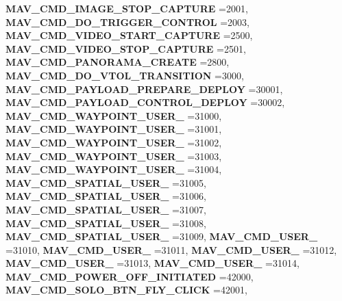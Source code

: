 \begin{DoxyCompactItemize}
\textbf{ M\+A\+V\+\_\+\+C\+M\+D\+\_\+\+I\+M\+A\+G\+E\+\_\+\+S\+T\+O\+P\+\_\+\+C\+A\+P\+T\+U\+RE} =2001, 
\textbf{ M\+A\+V\+\_\+\+C\+M\+D\+\_\+\+D\+O\+\_\+\+T\+R\+I\+G\+G\+E\+R\+\_\+\+C\+O\+N\+T\+R\+OL} =2003, 
\textbf{ M\+A\+V\+\_\+\+C\+M\+D\+\_\+\+V\+I\+D\+E\+O\+\_\+\+S\+T\+A\+R\+T\+\_\+\+C\+A\+P\+T\+U\+RE} =2500, 
\newline
\textbf{ M\+A\+V\+\_\+\+C\+M\+D\+\_\+\+V\+I\+D\+E\+O\+\_\+\+S\+T\+O\+P\+\_\+\+C\+A\+P\+T\+U\+RE} =2501, 
\textbf{ M\+A\+V\+\_\+\+C\+M\+D\+\_\+\+P\+A\+N\+O\+R\+A\+M\+A\+\_\+\+C\+R\+E\+A\+TE} =2800, 
\textbf{ M\+A\+V\+\_\+\+C\+M\+D\+\_\+\+D\+O\+\_\+\+V\+T\+O\+L\+\_\+\+T\+R\+A\+N\+S\+I\+T\+I\+ON} =3000, 
\textbf{ M\+A\+V\+\_\+\+C\+M\+D\+\_\+\+P\+A\+Y\+L\+O\+A\+D\+\_\+\+P\+R\+E\+P\+A\+R\+E\+\_\+\+D\+E\+P\+L\+OY} =30001, 
\newline
\textbf{ M\+A\+V\+\_\+\+C\+M\+D\+\_\+\+P\+A\+Y\+L\+O\+A\+D\+\_\+\+C\+O\+N\+T\+R\+O\+L\+\_\+\+D\+E\+P\+L\+OY} =30002, 
\textbf{ M\+A\+V\+\_\+\+C\+M\+D\+\_\+\+W\+A\+Y\+P\+O\+I\+N\+T\+\_\+\+U\+S\+E\+R\+\_} =31000, 
\textbf{ M\+A\+V\+\_\+\+C\+M\+D\+\_\+\+W\+A\+Y\+P\+O\+I\+N\+T\+\_\+\+U\+S\+E\+R\+\_} =31001, 
\textbf{ M\+A\+V\+\_\+\+C\+M\+D\+\_\+\+W\+A\+Y\+P\+O\+I\+N\+T\+\_\+\+U\+S\+E\+R\+\_} =31002, 
\newline
\textbf{ M\+A\+V\+\_\+\+C\+M\+D\+\_\+\+W\+A\+Y\+P\+O\+I\+N\+T\+\_\+\+U\+S\+E\+R\+\_} =31003, 
\textbf{ M\+A\+V\+\_\+\+C\+M\+D\+\_\+\+W\+A\+Y\+P\+O\+I\+N\+T\+\_\+\+U\+S\+E\+R\+\_} =31004, 
\textbf{ M\+A\+V\+\_\+\+C\+M\+D\+\_\+\+S\+P\+A\+T\+I\+A\+L\+\_\+\+U\+S\+E\+R\+\_} =31005, 
\textbf{ M\+A\+V\+\_\+\+C\+M\+D\+\_\+\+S\+P\+A\+T\+I\+A\+L\+\_\+\+U\+S\+E\+R\+\_} =31006, 
\newline
\textbf{ M\+A\+V\+\_\+\+C\+M\+D\+\_\+\+S\+P\+A\+T\+I\+A\+L\+\_\+\+U\+S\+E\+R\+\_} =31007, 
\textbf{ M\+A\+V\+\_\+\+C\+M\+D\+\_\+\+S\+P\+A\+T\+I\+A\+L\+\_\+\+U\+S\+E\+R\+\_} =31008, 
\textbf{ M\+A\+V\+\_\+\+C\+M\+D\+\_\+\+S\+P\+A\+T\+I\+A\+L\+\_\+\+U\+S\+E\+R\+\_} =31009, 
\textbf{ M\+A\+V\+\_\+\+C\+M\+D\+\_\+\+U\+S\+E\+R\+\_} =31010, 
\newline
\textbf{ M\+A\+V\+\_\+\+C\+M\+D\+\_\+\+U\+S\+E\+R\+\_} =31011, 
\textbf{ M\+A\+V\+\_\+\+C\+M\+D\+\_\+\+U\+S\+E\+R\+\_} =31012, 
\textbf{ M\+A\+V\+\_\+\+C\+M\+D\+\_\+\+U\+S\+E\+R\+\_} =31013, 
\textbf{ M\+A\+V\+\_\+\+C\+M\+D\+\_\+\+U\+S\+E\+R\+\_} =31014, 
\newline
\textbf{ M\+A\+V\+\_\+\+C\+M\+D\+\_\+\+P\+O\+W\+E\+R\+\_\+\+O\+F\+F\+\_\+\+I\+N\+I\+T\+I\+A\+T\+ED} =42000, 
\textbf{ M\+A\+V\+\_\+\+C\+M\+D\+\_\+\+S\+O\+L\+O\+\_\+\+B\+T\+N\+\_\+\+F\+L\+Y\+\_\+\+C\+L\+I\+CK} =42001, 

\end{DoxyCompactItemize}
